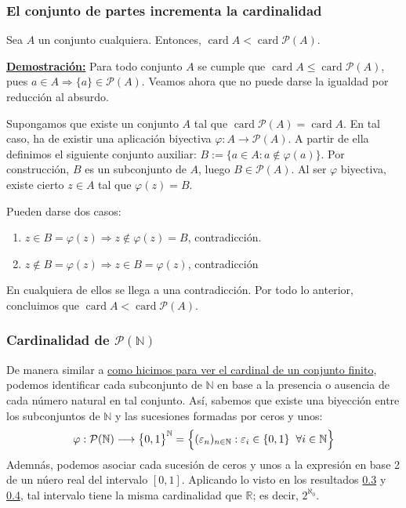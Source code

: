 \documentclass[12pt,a4paper]{article}
\newcommand{\card}{\operatorname{card}}
\newcommand{\R}{\mathbb{R}}
\newcommand{\N}{\mathbb{N}}
\newcounter{unit}[section]
\renewcommand{\theunit}{\arabic{unit}}
\renewcommand{\thesubsubsection}{\theunit.\arabic{subsubsection}}
\newcommand{\dem}{
    \noindent \underline{\textbf{Demostración:}}
}
\newcommand{\result}[1]{%
  \subsubsection{#1}%
  \label{subsubsection:\thesubsubsection}%
}
\begin{document}
\vspace{6mm}
\result{El conjunto de partes incrementa la cardinalidad}
\hspace{3mm}
Sea $A$ un conjunto cualquiera. Entonces, $\card A < \card \mathcal{P}(A)$.

\vspace{4mm}
\dem Para todo conjunto $A$ se cumple que $\card A \leq \card \mathcal{P}(A)$,
pues $a \in A \Rightarrow \{a\} \in \mathcal{P}(A)$. Veamos ahora que no puede darse
la igualdad por reducción al absurdo.

\vspace{2mm}
Supongamos que existe un conjunto $A$ tal que $\card \mathcal{P}(A) = \card A$.
En tal caso, ha de existir una aplicación biyectiva $\varphi : A \to \mathcal{P}(A)$.
A partir de ella definimos el siguiente conjunto auxiliar: $B := \{a \in A : a \notin \varphi(a)\}$.
Por construcción, $B$ es un subconjunto de $A$, luego $B \in \mathcal{P}(A)$. Al ser $\varphi$ biyectiva,
existe cierto $z \in A$ tal que $\varphi(z) = B$.

\noindent
Pueden darse dos casos:
\begin{enumerate}[label=\arabic*.)]
    \item $z \in B = \varphi(z) \Rightarrow z \notin \varphi(z) = B$, contradicción.
    \item $z \notin B = \varphi(z) \Rightarrow z \in B = \varphi(z)$, contradicción
\end{enumerate}
En cualquiera de ellos se llega a una contradicción. Por todo lo anterior, concluimos que $\card A < \card \mathcal{P}(A)$.

\vspace{6mm}
\result{Cardinalidad de \texorpdfstring{$\mathcal{P}(\N)$}{P(N)}}
\hspace{3mm} De manera similar a \hyperref[racionales-numerables]{como hicimos para ver el cardinal de un conjunto finito}, podemos identificar cada
subconjunto de $\N$ en base a la presencia o ausencia de cada número natural en tal conjunto. Así, sabemos que existe una biyección entre los subconjuntos
de $\N$ y las sucesiones formadas por ceros y unos:
$$\varphi : \mathcal{P}(\N) \longrightarrow \big\{0,1\big\}^\N = \Big\{(\varepsilon_n)_{n \in \N} : \varepsilon_i \in \{0,1\} \hspace{2mm}  \forall i \in \N\Big\}$$
Ademnás, podemos asociar cada sucesión de ceros y unos a la expresión en base 2 de un núero real del intervalo $[0,1]$. Aplicando lo visto en los
resultados \hyperref[subsubsection:0.3]{0.3} y \hyperref[subsubsection:0.4]{0.4}, tal intervalo tiene la misma cardinalidad que $\R$; es decir, $2^{\aleph_0}$.
\end{document}
